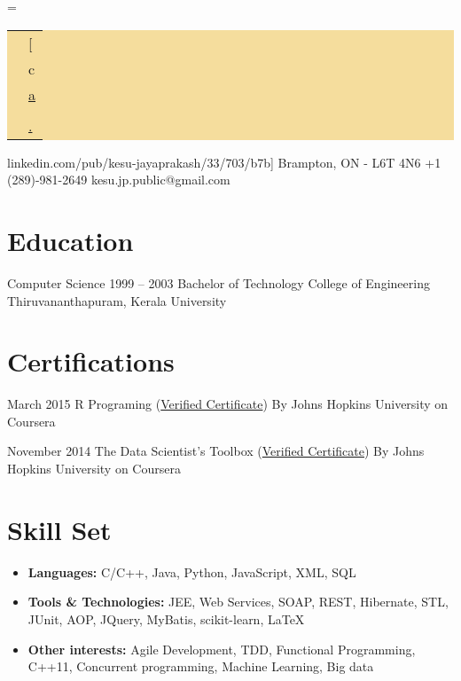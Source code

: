 \documentclass{tccv}
\renewcommand\personal[5][]{%
    \needspace{0.5\textheight}%
    \newdimen\boxwidth%
    \boxwidth=\dimexpr\linewidth-2\fboxsep\relax%
    \colorbox[HTML]{F5DD9D}{%
    \begin{tabularx}{\boxwidth}{c|X}
    \Writinghand & {#2}\smallskip\\
    \Telefon     & {#3}\smallskip\\
    \Letter      & \href{mailto:#4}{#4}
    \ifstrempty{#1}{}{\smallskip\\ \Lightning & \href{http://#1}{#1}}
    \ifstrempty{#5}{}{\smallskip\\ \Lightning & \href{http://#5}{#5}}
    \end{tabularx}}}
\begin{document}
\personal
    [ca.linkedin.com/pub/kesu-jayaprakash/33/703/b7b]
    {Brampton, ON - L6T 4N6}
    {+1 (289)-981-2649}
    {kesu.jp.public@gmail.com}

\section{Education}

\begin{yearlist}

\item[Computer Science]{1999 -- 2003}
     {Bachelor of Technology}
     {College of Engineering Thiruvananthapuram, Kerala University}
\end{yearlist}

\section{Certifications}

\begin{yearlist}

\item{March 2015}
     {R Programing (\href{https://www.coursera.org/account/accomplishments/certificate/ZNR9NY3SSH}{Verified Certificate})}
     {By Johns Hopkins University on Coursera}

\item{November 2014}
     {The Data Scientist's Toolbox (\href{https://www.coursera.org/account/accomplishments/certificate/745X8Z7SQJ}{Verified Certificate})}
     {By Johns Hopkins University on Coursera}

\end{yearlist}


\section{Skill Set}
{\begin{itemize}
\item
    {\textbf{Languages:} C/C++, Java, Python, JavaScript, XML, SQL}
\item
    {\textbf{Tools \& Technologies:} JEE, Web Services, SOAP, REST, Hibernate, STL, JUnit, AOP, JQuery, MyBatis, scikit-learn, \LaTeX}
\item
    {\textbf{Other interests:} Agile Development, TDD, Functional Programming, C++11, Concurrent programming, Machine Learning, Big data}
\end{itemize}}
\end{document}
